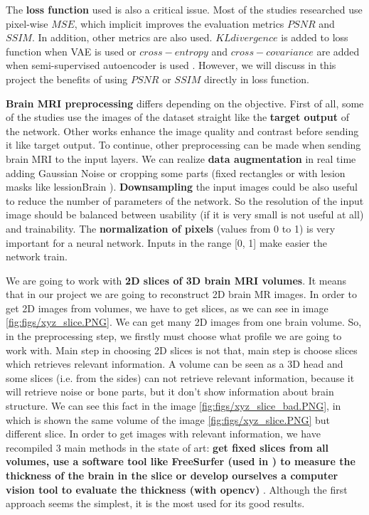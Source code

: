 The \textbf{loss function} used is also a critical issue. Most of the studies researched use pixel-wise $MSE$, which implicit improves the evaluation metrics $PSNR$ and $SSIM$. In addition, other metrics are also used. $KL divergence$ is added to loss function when VAE is used or $cross-entropy$ and $cross-covariance$ are added when semi-supervised autoencoder is used \cite{pinaya2019}. However, we will discuss in this project the benefits of using $PSNR$ or $SSIM$ directly in loss function. 

\textbf{Brain MRI preprocessing} differs depending on the objective. First of all, some of the studies use the images of the dataset straight like the \textbf{target output} of the network. Other works enhance the image quality and contrast before sending it like target output. 
To continue, other preprocessing can be made when sending brain MRI to the input layers. We can realize \textbf{data augmentation} in real time adding Gaussian Noise or cropping some parts (fixed rectangles or with lesion masks like lessionBrain \cite{lesionBrain}).
\textbf{Downsampling} the input images could be also useful to reduce the number of parameters of the network. So the resolution of the input image should be balanced between usability (if it is very small is not useful at all) and trainability.  The \textbf{normalization of pixels} (values from 0 to 1) is very important for a neural network.  Inputs in the range [0, 1] make easier the network train.

We are going to work with \textbf{2D slices of 3D brain MRI volumes}. It means that  in our project we are going to reconstruct 2D brain MR images. In order to get 2D images from volumes, we have to get slices, as we can see in image \ref{fig:figs/xyz_slice.PNG}. We can get many 2D images from one brain volume. So, in the  preprocessing step, we firstly must choose what profile we are going to work with. Main step in choosing 2D slices is not that, main step is choose slices which retrieves relevant information. A volume can be seen as a 3D head and some slices (i.e. from the sides) can not retrieve relevant information, because it will retrieve noise or bone parts, but it don't show information about brain structure. We can see this fact in the image \ref{fig:figs/xyz_slice_bad.PNG}, in which is shown the same volume of the image \ref{fig:figs/xyz_slice.PNG} but different slice. In order to get images with relevant information, we have recompiled 3 main methods in the state of art: \textbf{get fixed slices from all volumes, use a software tool like FreeSurfer (used in \cite{pinaya2019}) to measure the thickness of the brain in the slice or develop ourselves a computer vision tool to evaluate the thickness (with opencv)  }. Although the first approach seems the simplest, it is the most used for its good results.

